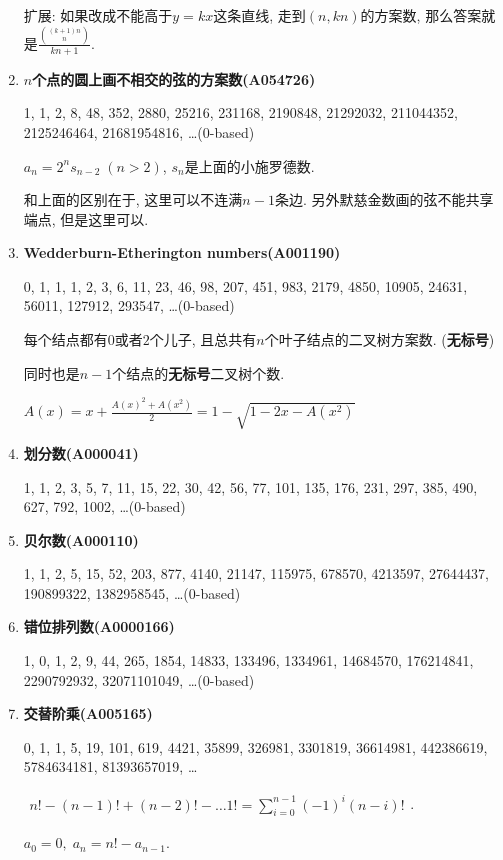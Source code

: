\begin{enumerate}
扩展: 如果改成不能高于$y = kx$这条直线, 走到$(n, kn)$的方案数, 那么答案就是$ \frac {{(k + 1)n \choose n}} {kn + 1} $.

\item \textbf{$n$个点的圆上画不相交的弦的方案数(A054726)}

1, 1, 2, 8, 48, 352, 2880, 25216, 231168, 2190848, 21292032, 211044352, 2125246464, 21681954816, \dots \;(0-based)

$ a_n = 2^n s_{n - 2} \; (n > 2) $, $s_n$是上面的小施罗德数.

和上面的区别在于, 这里可以不连满$n-1$条边. 另外默慈金数画的弦不能共享端点, 但是这里可以.

\item \textbf{Wedderburn-Etherington numbers(A001190)}

0, 1, 1, 1, 2, 3, 6, 11, 23, 46, 98, 207, 451, 983, 2179, 4850, 10905, 24631, 56011, 127912, 293547, \dots \;(0-based)

每个结点都有$0$或者$2$个儿子, 且总共有$n$个叶子结点的二叉树方案数. (\textbf{无标号})

同时也是$n-1$个结点的\textbf{无标号}二叉树个数.

$ A(x) = x + \frac {A(x) ^ 2 + A(x ^ 2)} 2 = 1 - \sqrt{1 - 2x - A(x ^ 2)} $
	
\item \textbf{划分数(A000041)}

1, 1, 2, 3, 5, 7, 11, 15, 22, 30, 42, 56, 77, 101, 135, 176, 231, 297, 385, 490, 627, 792, 1002, \dots \;(0-based)

\item \textbf{贝尔数(A000110)}

1, 1, 2, 5, 15, 52, 203, 877, 4140, 21147, 115975, 678570, 4213597, 27644437, 190899322, 1382958545, \dots \;(0-based)

\item \textbf{错位排列数(A0000166)}

1, 0, 1, 2, 9, 44, 265, 1854, 14833, 133496, 1334961, 14684570, 176214841, 2290792932, 32071101049, \dots \;(0-based)

\item \textbf{交替阶乘(A005165)}

0, 1, 1, 5, 19, 101, 619, 4421, 35899, 326981, 3301819, 36614981, 442386619, 5784634181, 81393657019, \dots

$ \begin{aligned} n! - (n - 1)! + (n - 2)! - \dots 1! = \sum_{i = 0} ^ {n - 1} (-1)^i (n - i)! \end{aligned} $.

$ a_0 = 0,\; a_n = n! - a_{n - 1} $.

\end{enumerate}

